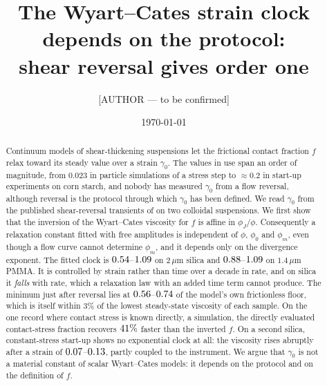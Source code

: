 \documentclass[aps,pre,reprint,superscriptaddress,nofootinbib]{revtex4-2}
\begin{document}
\title{The Wyart--Cates strain clock depends on the protocol:\\ shear reversal gives order one}

\author{[AUTHOR --- to be confirmed]}

\date{\today}

\begin{abstract}
Continuum models of shear-thickening suspensions let the frictional contact fraction $f$
relax toward its steady value over a strain $\gamma_0$. The values in use span an order
of magnitude, from $0.023$ in particle simulations of a stress step to $\approx 0.2$ in
start-up experiments on corn starch, and nobody has measured $\gamma_0$ from a flow reversal,
although reversal is the protocol through which $\gamma_0$ has been defined. We read
$\gamma_0$ from the published shear-reversal transients of \citet{Lin2015} on two
colloidal suspensions. We first show that the inversion of the Wyart--Cates viscosity
for $f$ is affine in $\phi_J/\phi$. Consequently a relaxation constant fitted with free
amplitudes is independent of $\phi$, $\phi_0$ and $\phi_m$, even though a flow curve
cannot determine $\phi_m$, and it depends only on the divergence exponent. The fitted
clock is $0.54$--$1.09$ on $2\,\mu$m silica and $0.88$--$1.09$ on
$1.4\,\mu$m PMMA. It is controlled by strain rather than time over a decade in rate, and
on silica it \emph{falls} with rate, which a relaxation law with an added time term
cannot produce. The minimum just after reversal lies at $0.56$--$0.74$ of the model's own
frictionless floor, which is itself within $3\%$ of the lowest steady-state viscosity of  %
each sample. On the one record where contact stress is known directly, a simulation,
the directly evaluated contact-stress fraction recovers $41\%$ faster than the
inverted $f$. On a second silica, constant-stress start-up shows no exponential clock at all: the viscosity rises abruptly after a strain of $0.07$--$0.13$, partly coupled to the instrument. We argue that $\gamma_0$ is not a material constant of scalar Wyart--Cates
models: it depends on the protocol and on the definition of $f$.
\end{abstract}

\maketitle
\end{document}
